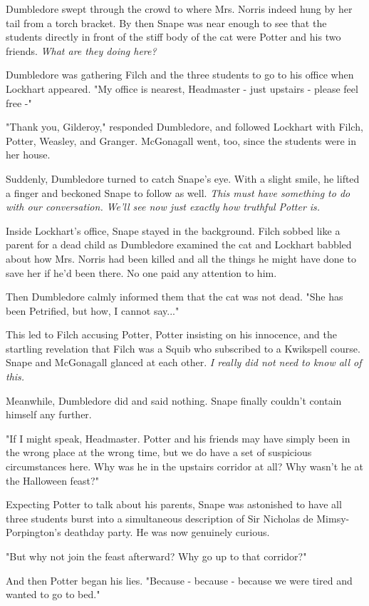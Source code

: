 \documentclass[a4paper,11pt]{article}
\begin{document}
Dumbledore swept through the crowd to where Mrs. Norris indeed hung by her tail from a torch bracket. By then Snape was near enough to see that the students directly in front of the stiff body of the cat were Potter and his two friends. \emph{What are they doing here?}

Dumbledore was gathering Filch and the three students to go to his office when Lockhart appeared. "My office is nearest, Headmaster - just upstairs - please feel free -"

"Thank you, Gilderoy," responded Dumbledore, and followed Lockhart with Filch, Potter, Weasley, and Granger. McGonagall went, too, since the students were in her house.

Suddenly, Dumbledore turned to catch Snape's eye. With a slight smile, he lifted a finger and beckoned Snape to follow as well. \emph{This must have something to do with our conversation. We'll see now just exactly how truthful Potter is.}

Inside Lockhart's office, Snape stayed in the background. Filch sobbed like a parent for a dead child as Dumbledore examined the cat and Lockhart babbled about how Mrs. Norris had been killed and all the things he might have done to save her if he'd been there. No one paid any attention to him.

Then Dumbledore calmly informed them that the cat was not dead. "She has been Petrified, but how, I cannot say..."

This led to Filch accusing Potter, Potter insisting on his innocence, and the startling revelation that Filch was a Squib who subscribed to a Kwikspell course. Snape and McGonagall glanced at each other. \emph{I really did not need to know all of this.}

Meanwhile, Dumbledore did and said nothing. Snape finally couldn't contain himself any further.

"If I might speak, Headmaster. Potter and his friends may have simply been in the wrong place at the wrong time, but we do have a set of suspicious circumstances here. Why was he in the upstairs corridor at all? Why wasn't he at the Halloween feast?"

Expecting Potter to talk about his parents, Snape was astonished to have all three students burst into a simultaneous description of Sir Nicholas de Mimsy-Porpington's deathday party. He was now genuinely curious.

"But why not join the feast afterward? Why go up to that corridor?"

And then Potter began his lies. "Because - because - because we were tired and wanted to go to bed."
\end{document}
